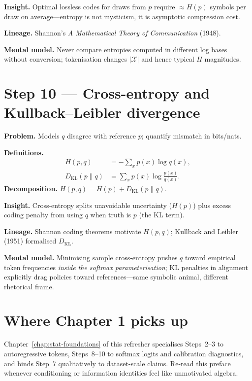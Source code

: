 \textbf{Insight.} Optimal lossless codes for draws from $p$ require $\approx H(p)$ symbols per draw on average---entropy is not mysticism, it is asymptotic compression cost.

\textbf{Lineage.} Shannon's \emph{A Mathematical Theory of Communication} (1948).

\textbf{Mental model.} Never compare entropies computed in different log bases without conversion; tokenisation changes $|\mathcal{X}|$ and hence typical $H$ magnitudes.

\section*{Step 10 --- Cross-entropy and Kullback--Leibler divergence}
\textbf{Problem.} Models $q$ disagree with reference $p$; quantify mismatch in bits/nats.

\textbf{Definitions.}
\begin{align*}
  H(p,q) &= -\sum_x p(x)\log q(x),\\
  D_{\mathrm{KL}}(p\|q) &= \sum_x p(x)\log\frac{p(x)}{q(x)}.
\end{align*}
\textbf{Decomposition.} $H(p,q)=H(p)+D_{\mathrm{KL}}(p\|q)$.

\textbf{Insight.} Cross-entropy splits unavoidable uncertainty ($H(p)$) plus excess coding penalty from using $q$ when truth is $p$ (the KL term).

\textbf{Lineage.} Shannon coding theorems motivate $H(p,q)$; Kullback and Leibler (1951) formalised $D_{\mathrm{KL}}$.

\textbf{Mental model.} Minimising sample cross-entropy pushes $q$ toward empirical token frequencies \emph{inside the softmax parameterisation}; KL penalties in alignment explicitly drag policies toward references---same symbolic animal, different rhetorical frame.

\section*{Where Chapter 1 picks up}
Chapter~\ref{chap:stat-foundations} of this refresher specialises Steps~2--3 to autoregressive tokens, Steps~8--10 to softmax logits and calibration diagnostics, and binds Step~7 qualitatively to dataset-scale claims. Re-read this preface whenever conditioning or information identities feel like unmotivated algebra.
